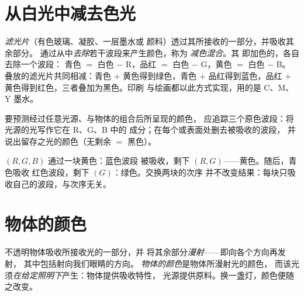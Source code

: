 \section{从白光中减去色光}

\begin{definition}[减色混合]\label{def:g11:color-light-sources:subtractive}
\emph{滤光片}（有色玻璃、凝胶、一层墨水或
颜料）透过其所接收的一部分，并吸收其余部分。
通过从中\emph{去除}若干波段来产生颜色，称为
\emph{减色混合}。其
即加色的，各自去除一个波段：
青色 $=$ 白色 $-$ R，品红 $=$ 白色 $-$ G，黄色 $=$ 白色 $-$ B。
叠放的滤光片共同相减：青色 $+$ 黄色得到绿色，青色
$+$ 品红得到蓝色，品红 $+$ 黄色得到红色，三者叠加为黑色。印刷
与绘画都以此方式实现，用的是 C、M、Y 墨水。
\end{definition}

\begin{method}[光谱跟踪法]\label{met:g11:color-light-sources:bookkeeping}
要预测经过任意光源、与物体的组合后所呈现的颜色，
应追踪三个原色波段：将光源的光写作它在 R、G、B 中的
成分；在每个或表面处删去被吸收的波段，
并说出留存之光的颜色（无剩余 $=$ 黑色）。
\end{method}

\begin{example}[滤光片串联]\label{ex:g11:color-light-sources:chain}
 $(R, G, B)$ 通过一块黄色：蓝色波段
被吸收，剩下 $(R, G)$——黄色。随后，青色吸收
红色波段，剩下 $(G)$：绿色。交换两块的次序
并不改变结果：每块只吸收自己的波段，与次序无关。
\end{example}

\section{物体的颜色}

\begin{definition}[漫射与物体颜色]\label{def:g11:color-light-sources:objectcolor}
不透明物体吸收所接收光的一部分，并
将其余部分\emph{漫射}——即向各个方向再发射，
其中包括射向我们眼睛的方向。
\emph{物体的颜色}是物体所漫射光的颜色，
而该光须\emph{在给定照明下}产生：物体提供吸收特性，
光源提供原料。换一盏灯，颜色便随之改变。
\end{definition}

